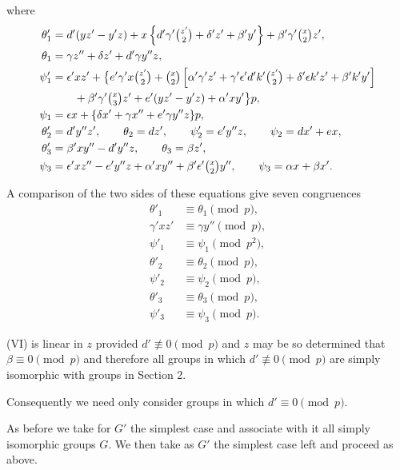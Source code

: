 \documentclass[oneside]{article}
\begin{document}
\noindent where
\begin{align*}
\theta'_1 &= d'(yz' - y'z) + x\left\{d'\gamma'\tbinom{z'}{2} + \delta'z' +
\beta'y'\right\} + \beta'\gamma'\tbinom{x}{2}z', \\
\theta_1 &= \gamma z'' + \delta z' + d'\gamma y''z, \\
\psi'_1 &= \epsilon'xz' + \bigl\{e'\gamma'x\tbinom{z'}{2} + \tbinom{x}{2}\left[\alpha'
  \gamma'z' + \gamma'\epsilon'd'k'\tbinom{z'}{2} + \delta'\epsilon k'z' +
  \beta'k'y'\right] \\
 & \qquad + \beta'\gamma'\tbinom{x}{3}z' + e'(yz' - y'z) + \alpha'xy'\bigr\}p, \\
\psi_1 &= \epsilon x + \{\delta x' + \gamma x'' + e'\gamma y''z\}p, \\
\theta'_2 &= d'y''z', \qquad \theta_2 = dz', \qquad \psi'_2 = e'y''z, \qquad
  \psi_2 = dx' + ex, \\
\theta'_3 &= \beta'xy'' - d'y''z, \qquad \theta_3 = \beta z', \\
\psi_3 &= \epsilon'xz'' - e'y''z + \alpha'xy'' + \beta'\epsilon'\tbinom{x}{2}y'',
  \qquad \psi_3 = \alpha x + \beta x'.
\end{align*}

A comparison of the two sides of these equations give seven congruences
\begin{align*}
\theta'_1  &\equiv \theta_1   \pmod{p},   \tag{I} \\
\gamma'xz' &\equiv \gamma y'' \pmod{p},   \tag{II} \\
\psi'_1    &\equiv \psi_1     \pmod{p^2}, \tag{III} \\
\theta'_2  &\equiv \theta_2   \pmod{p},   \tag{IV} \\
\psi'_2    &\equiv \psi_2     \pmod{p},   \tag{V} \\
\theta'_3  &\equiv \theta_3   \pmod{p},   \tag{VI} \\
\psi'_3    &\equiv \psi_3     \pmod{p}.   \tag{VII}
\end{align*}

(VI) is linear in $z$ provided $d' \not\equiv 0 \pmod{p}$ and $z$ may be
so determined that $\beta \equiv 0 \pmod{p}$ and therefore all groups in
which $d' \not\equiv 0 \pmod{p}$ are simply isomorphic with groups in
Section 2.

Consequently we need only consider groups in which $d' \equiv 0 \pmod{p}$.

As before we take for $G'$ the simplest case and associate with it all
simply isomorphic groups $G$. We then take as $G'$ the simplest case left
and proceed as above.
\end{document}
